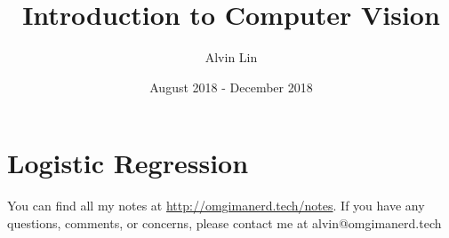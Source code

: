 \documentclass{math}
\title{Introduction to Computer Vision}
\author{Alvin Lin}
\date{August 2018 - December 2018}
\begin{document}
\maketitle

\section*{Logistic Regression}

\begin{center}
  You can find all my notes at \url{http://omgimanerd.tech/notes}. If you have
  any questions, comments, or concerns, please contact me at
  alvin@omgimanerd.tech
\end{center}
\end{document}
